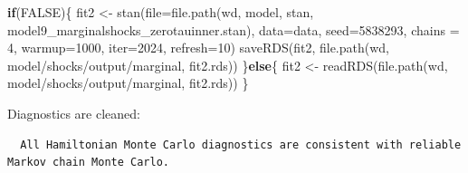 \documentclass[
  letterpaper,
  DIV=11,
  numbers=noendperiod]{scrartcl}
\newenvironment{Shaded}{\begin{snugshade}}{\end{snugshade}}
\newcommand{\AttributeTok}[1]{\textcolor[rgb]{0.40,0.45,0.13}{#1}}
\newcommand{\ConstantTok}[1]{\textcolor[rgb]{0.56,0.35,0.01}{#1}}
\newcommand{\ControlFlowTok}[1]{\textcolor[rgb]{0.00,0.23,0.31}{\textbf{#1}}}
\newcommand{\DecValTok}[1]{\textcolor[rgb]{0.68,0.00,0.00}{#1}}
\newcommand{\FunctionTok}[1]{\textcolor[rgb]{0.28,0.35,0.67}{#1}}
\newcommand{\NormalTok}[1]{\textcolor[rgb]{0.00,0.23,0.31}{#1}}
\newcommand{\OtherTok}[1]{\textcolor[rgb]{0.00,0.23,0.31}{#1}}
\newcommand{\SpecialCharTok}[1]{\textcolor[rgb]{0.37,0.37,0.37}{#1}}
\newcommand{\StringTok}[1]{\textcolor[rgb]{0.13,0.47,0.30}{#1}}
\begin{document}
\linespread{2}

\linespread{0.5}

\begin{Shaded}
\begin{Highlighting}[]
\ControlFlowTok{if}\NormalTok{(}\ConstantTok{FALSE}\NormalTok{)\{}
\NormalTok{  fit2 }\OtherTok{\textless{}{-}} \FunctionTok{stan}\NormalTok{(}\AttributeTok{file=}\FunctionTok{file.path}\NormalTok{(wd, }\StringTok{\textquotesingle{}model\textquotesingle{}}\NormalTok{, }\StringTok{\textquotesingle{}stan\textquotesingle{}}\NormalTok{, }\StringTok{\textquotesingle{}model9\_marginalshocks\_zerotauinner.stan\textquotesingle{}}\NormalTok{),}
            \AttributeTok{data=}\NormalTok{data, }\AttributeTok{seed=}\DecValTok{5838293}\NormalTok{, }\AttributeTok{chains =} \DecValTok{4}\NormalTok{,}
            \AttributeTok{warmup=}\DecValTok{1000}\NormalTok{, }\AttributeTok{iter=}\DecValTok{2024}\NormalTok{, }\AttributeTok{refresh=}\DecValTok{10}\NormalTok{)}
  \FunctionTok{saveRDS}\NormalTok{(fit2, }\FunctionTok{file.path}\NormalTok{(wd, }\StringTok{\textquotesingle{}model/shocks/output/marginal\textquotesingle{}}\NormalTok{, }\StringTok{\textquotesingle{}fit2.rds\textquotesingle{}}\NormalTok{))}
\NormalTok{\}}\ControlFlowTok{else}\NormalTok{\{}
\NormalTok{  fit2 }\OtherTok{\textless{}{-}} \FunctionTok{readRDS}\NormalTok{(}\FunctionTok{file.path}\NormalTok{(wd, }\StringTok{\textquotesingle{}model/shocks/output/marginal\textquotesingle{}}\NormalTok{, }\StringTok{\textquotesingle{}fit2.rds\textquotesingle{}}\NormalTok{))}
\NormalTok{\}}
\end{Highlighting}
\end{Shaded}

\linespread{2}

Diagnostics are cleaned:

\linespread{0.5}

\begin{Shaded}
\end{Shaded}

\begin{verbatim}
  All Hamiltonian Monte Carlo diagnostics are consistent with reliable
Markov chain Monte Carlo.
\end{verbatim}
\end{document}
